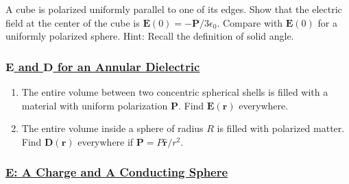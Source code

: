 A cube is polarized uniformly parallel to one of its edges. Show that the electric field at the center of the cube is $\mathbf{E}(0)=-\mathbf{P} / 3 \epsilon_{0} .$ Compare with $\mathbf{E}(0)$ for a uniformly polarized sphere. Hint: Recall the definition of solid angle.

\subsubsection{\hyperref[E and D for an Annular Dielectric]{$\mathbf{E}$ and $\mathbf{D}$ for an Annular Dielectric}}

\begin{enumerate}
	\item The entire volume between two concentric spherical shells is filled with a material with uniform polarization $\mathbf{P}$. Find $\mathbf{E}(\mathbf{r})$ everywhere.
	\item The entire volume inside a sphere of radius $R$ is filled with polarized matter. Find $\mathbf{D}(\mathbf{r})$ everywhere if $\mathbf{P}=P \hat{\mathbf{r}} / r^{2}$.
\end{enumerate}


\subsubsection{\hyperref[E: A Charge and A Conducting Sphere]{E: A Charge and A Conducting Sphere}}

